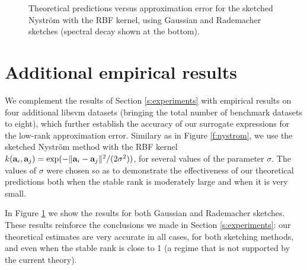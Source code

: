 \documentclass{article}
\begin{document}
\begin{figure}
  \caption{Theoretical predictions versus approximation error for the
    sketched Nystr\"om with the RBF kernel, using Gaussian and
    Rademacher sketches (spectral decay shown at the bottom).}\label{f:nystrom2}
\end{figure}

\section{Additional empirical results}
\label{a:experiments}

We complement the results of Section \ref{s:experiments} with
empirical results on four additional libsvm datasets \cite{libsvm} (bringing
the total number of benchmark datasets to eight), which further
establish the accuracy of our surrogate expressions for the low-rank approximation
error. Similary as in Figure \ref{f:nystrom}, we use the sketched
Nystr\"om method \cite{revisiting-nystrom} with the RBF kernel
$k(\mathbf a_i,\mathbf a_j)=\exp(-\|\mathbf a_i-\mathbf a_j\|^2/(2\sigma^2))$, for several values
of the parameter $\sigma$. The values of $\sigma$ were chosen so as to
demonstrate the effectiveness of our theoretical predictions both when the
stable rank is moderately large and when it is very small.

In Figure \ref{f:nystrom2} we show the results for both Gaussian and
Rademacher sketches. These results reinforce the conclusions we made in
Section \ref{s:experiments}: our theoretical estimates are very
accurate in all cases, for both sketching methods, and even when the
stable rank is close to 1 (a regime that is not supported by the
current theory).
\end{document}
